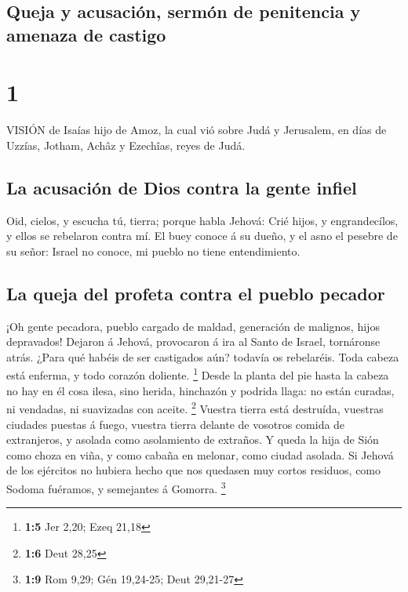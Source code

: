 \hypertarget{queja-y-acusaciuxf3n-sermuxf3n-de-penitencia-y-amenaza-de-castigo}{%
\subsection{Queja y acusación, sermón de penitencia y amenaza de
castigo}\label{queja-y-acusaciuxf3n-sermuxf3n-de-penitencia-y-amenaza-de-castigo}}

\hypertarget{section}{%
\section{1}\label{section}}

 VISIÓN de Isaías hijo de Amoz, la cual vió sobre Judá y
Jerusalem, en días de Uzzías, Jotham, Achâz y Ezechîas, reyes de Judá.

\hypertarget{la-acusaciuxf3n-de-dios-contra-la-gente-infiel}{%
\subsection{La acusación de Dios contra la gente
infiel}\label{la-acusaciuxf3n-de-dios-contra-la-gente-infiel}}

 Oid, cielos, y escucha tú, tierra; porque habla Jehová:
Crié hijos, y engrandecílos, y ellos se rebelaron contra mí.
 El buey conoce á su dueño, y el asno el pesebre de su
señor: Israel no conoce, mi pueblo no tiene entendimiento.

\hypertarget{la-queja-del-profeta-contra-el-pueblo-pecador}{%
\subsection{La queja del profeta contra el pueblo
pecador}\label{la-queja-del-profeta-contra-el-pueblo-pecador}}

 ¡Oh gente pecadora, pueblo cargado de maldad, generación de
malignos, hijos depravados! Dejaron á Jehová, provocaron á ira al Santo
de Israel, tornáronse atrás.  ¿Para qué habéis de ser
castigados aún? todavía os rebelaréis. Toda cabeza está enferma, y todo
corazón doliente. \footnote{\textbf{1:5} Jer 2,20; Ezeq 21,18}
 Desde la planta del pie hasta la cabeza no hay en él cosa
ilesa, sino herida, hinchazón y podrida llaga: no están curadas, ni
vendadas, ni suavizadas con aceite. \footnote{\textbf{1:6} Deut 28,25}
 Vuestra tierra está destruída, vuestras ciudades puestas á
fuego, vuestra tierra delante de vosotros comida de extranjeros, y
asolada como asolamiento de extraños.  Y queda la hija de
Sión como choza en viña, y como cabaña en melonar, como ciudad asolada.
 Si Jehová de los ejércitos no hubiera hecho que nos
quedasen muy cortos residuos, como Sodoma fuéramos, y semejantes á
Gomorra. \footnote{\textbf{1:9} Rom 9,29; Gén 19,24-25; Deut 29,21-27}

